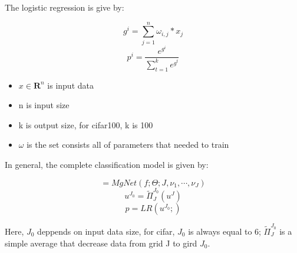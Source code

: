 The logistic regression is give by:
\begin{breakablealgorithm}
	\caption{$[p]={\rm LR}(x; \omega)$}
	\label{alg: LR}
	\begin{algorithmic}
		\begin{equation}
		g^{i} = \sum_{j=1}^{n}\omega_{i,j}*x_j
		\end{equation}
		\EndFor
		\begin{equation}
		p^{i} = \frac{e^{g^i}}{\sum_{t=1}^{k}e^{g^t}}
		\end{equation}
		\EndFor		
	\end{algorithmic}
\end{breakablealgorithm}

\begin{itemize}
	\item  $x \in \mathbf{R}^n$ is input data
	\item n is input size
	\item k is output size, for cifar100, k is 100
	\item $\omega$ is the set consists all of parameters that needed to train
\end{itemize}


In general, the complete classification model is given by: 

\begin{breakablealgorithm}
	\caption{$[p]={\rm Classification}(f; \Theta,\omega)$}
	\begin{algorithmic}
		\begin{equation}
		[u^1, u^2, \cdots, u^J,f^1,f^2,\cdots,f^J]  = MgNet(f; \Theta; J, \nu_1,\cdots,\nu_J)
		\end{equation}
		\begin{equation}
		u^{J_0} = \tilde{\Pi}_{J}^{J_0}(u^J)
		\end{equation}
		\begin{equation}
		p  = LR(u^{J_0};)
		\end{equation}
	\end{algorithmic}
\end{breakablealgorithm}

Here, $J_0$ deppends on input data size, for cifar, $J_0$ is always equal to 6; $\tilde{\Pi}_{J}^{J_0}$ is a simple average that decrease data from grid J to gird $J_0$.


